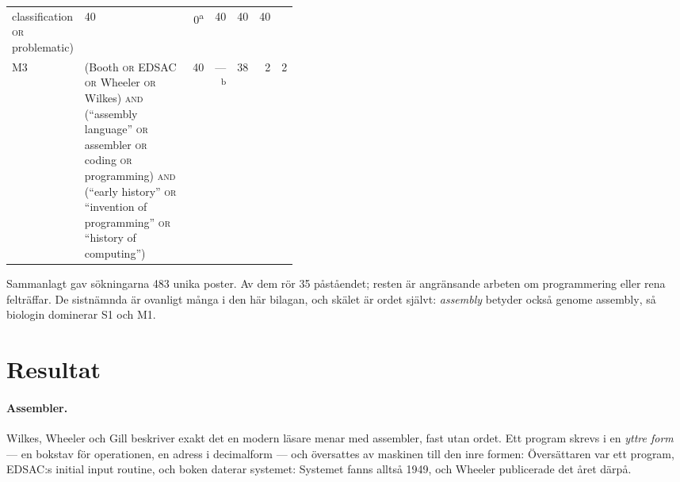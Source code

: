 \begin{table}[!htb]
\begin{tabular}{@{}lp{0.42\linewidth}rrrrr@{}}
           classification \textsc{or} problematic)
         & 40 & 0\textsuperscript{a} & 40 & 40 & 40 \\
      M3 & (Booth \textsc{or} EDSAC \textsc{or} Wheeler \textsc{or} Wilkes)
           \textsc{and} (\enquote{assembly language} \textsc{or} assembler
           \textsc{or} coding \textsc{or} programming) \textsc{and}
           (\enquote{early history} \textsc{or} \enquote{invention of
           programming} \textsc{or} \enquote{history of computing})
         & 40 & ---\textsuperscript{b} & 38 & 2 & 2 \\
      \bottomrule
    \end{tabular}
\end{table}

Sammanlagt gav sökningarna 483 unika poster.  Av dem rör 35 påståendet;
resten är angränsande arbeten om programmering eller rena felträffar.  De
sistnämnda är ovanligt många i den här bilagan, och skälet är ordet
självt: \emph{assembly} betyder också \foreignlanguage{english}{genome
assembly}, så biologin dominerar S1 och M1.

\section{Resultat}
\label{sec:sprak-resultat}

\paragraph{Assembler.}  Wilkes, Wheeler och Gill beskriver exakt det en
modern läsare menar med assembler, fast utan ordet.  Ett program skrevs
i en \emph{yttre form} --- en bokstav för operationen, en adress i
decimalform --- och översattes av maskinen till den inre formen:
  Översättaren var ett
program, EDSAC:s \foreignlanguage{english}{initial input routine}, och
boken daterar systemet:   Systemet fanns alltså 1949, och Wheeler
publicerade det året därpå\autocite{Wheeler1950InitialOrders}.


